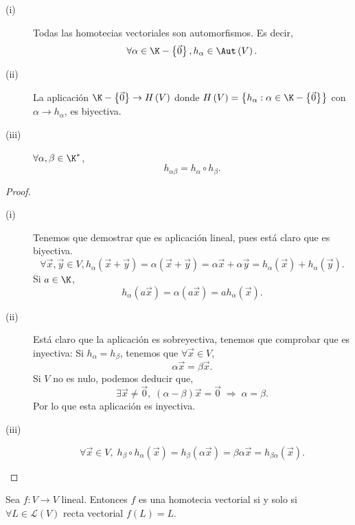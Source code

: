 \begin{ftheorem}[]
\normalfont 
\begin{description}
	\item[(i)] Todas las homotecias vectoriales son automorfismos. Es decir, 
		\[ \forall \alpha \in \K - \left\{ \vec{0}\right\},  h_{\alpha } \in \Aut\left(V\right). \]
		\item[(ii)] La aplicación $\displaystyle \K - \left\{ \vec{0}\right\} \to H\left(V\right) $ donde $\displaystyle H\left(V\right) = \left\{ h_{\alpha }: \alpha \in \K - \left\{ \vec{0}\right\} \right\}  $ con $\displaystyle \alpha \to h_{\alpha } $, es biyectiva. 
		\item[(iii)] $\displaystyle \forall \alpha, \beta \in \K^{*} $, 
			\[h_{\alpha \beta } = h_{\alpha }\circ h_{\beta } .\]
\end{description}
\end{ftheorem}
\begin{proof}
\begin{description}
\item[(i)] Tenemos que demostrar que es aplicación lineal, pues está claro que es biyectiva. 
	\[  \forall \vec{x}, \vec{y} \in V ,  h_{\alpha }\left(\vec{x} + \vec{y}\right) = \alpha \left(\vec{x}+\vec{y}\right) = \alpha \vec{x}+\alpha\vec{y} = h_{\alpha }\left(\vec{x}\right) + h_{\alpha }\left(\vec{y}\right).\]
Si $\displaystyle a \in \K  $,
		\[h_{\alpha }\left(a\vec{x}\right) = \alpha \left(a\vec{x}\right) = a h_{\alpha }\left(\vec{x}\right) .\]
\item[(ii)] Está claro que la aplicación es sobreyectiva, tenemos que comprobar que es inyectiva: 
	Si $\displaystyle h_{\alpha } = h_{\beta } $, tenemos que $\displaystyle \forall \vec{x} \in V $,
\[\alpha \vec{x} = \beta \vec{x} .\]
Si $\displaystyle V  $ no es nulo, podemos deducir que,
\[\exists \vec{x} \neq \vec{0}, \; \left(\alpha - \beta \right) \vec{x} = \vec{0} \; \Rightarrow \; \alpha = \beta  .\]
Por lo que esta aplicación es inyectiva.
\item[(iii)]
\[\forall \vec{x} \in V, \; h_{\beta }\circ h_{\alpha }\left(\vec{x}\right) = h_{ \beta }\left(\alpha \vec{x}\right) = \beta \alpha \vec{x} = h_{\beta \alpha}\left(\vec{x}\right).\]
\end{description}
\end{proof}


\begin{ftheorem}[]
\normalfont Sea $\displaystyle f : V \to V $ lineal. Entonces $\displaystyle f $ es una homotecia vectorial si y solo si $\displaystyle \forall L \in \mathcal{L}\left(V\right) $ recta vectorial $\displaystyle f\left(L\right) = L $.
\end{ftheorem}

